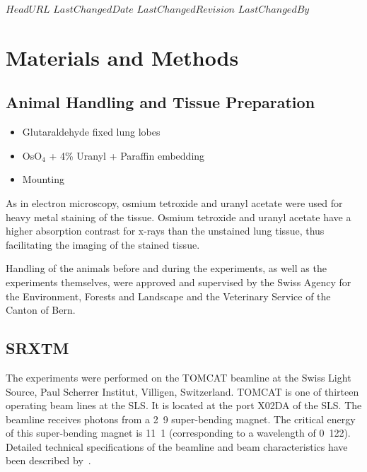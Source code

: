 \svnidlong
{$HeadURL$}
{$LastChangedDate$}
{$LastChangedRevision$}
{$LastChangedBy$}
\section{Materials and Methods}
\label{sec:materials and methods}
\subsection{Animal Handling and Tissue Preparation}
\begin{itemize}
	\item Glutaraldehyde fixed lung lobes
	\item OsO$_4$ + 4\% Uranyl + Paraffin embedding 
	\item Mounting
\end{itemize}

As in electron microscopy, osmium tetroxide and uranyl acetate were used for heavy metal staining of the tissue. Osmium tetroxide and uranyl acetate have a higher absorption contrast for x-rays than the unstained lung tissue, thus facilitating the imaging of the stained tissue.

Handling of the animals before and during the experiments, as well as the experiments themselves, were approved and supervised by the Swiss Agency for the Environment, Forests and Landscape and the Veterinary Service of the Canton of Bern.

\subsection{SRXTM}
The experiments were performed on the TOMCAT beamline at the Swiss Light Source, Paul Scherrer Institut, Villigen, Switzerland. TOMCAT is one of thirteen operating beam lines at the SLS. It is located at the port X02DA of the SLS. The beamline receives photons from a \unit{2.9}{\tesla} super-bending magnet. The critical energy of this super-bending magnet is \unit{11.1}{\kilo\electronvolt} (corresponding to a wavelength of \unit{0.122}{\nano\meter}). Detailed technical specifications of the beamline and beam characteristics have been described by~\citet{Stampanoni2006a,Stampanoni2007}.

